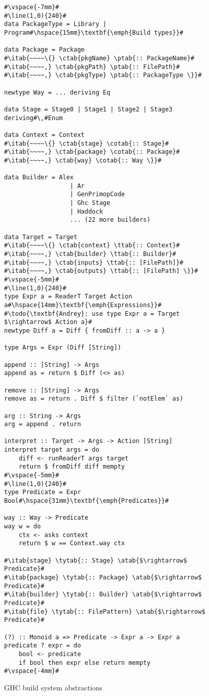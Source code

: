 \begin{figure}
\begin{lstlisting}
#\vspace{-7mm}#
#\line(1,0){240}#
data PackageType = Library | Program#\hspace{15mm}\textbf{\emph{Build types}}#

data Package = Package
#\itab{~~~~\{} \ctab{pkgName} \ptab{:: PackageName}#
#\itab{~~~~,} \ctab{pkgPath} \ptab{:: FilePath}#
#\itab{~~~~,} \ctab{pkgType} \ptab{:: PackageType \}}#

newtype Way = ... deriving Eq

data Stage = Stage0 | Stage1 | Stage2 | Stage3 deriving#\,#Enum

data Context = Context
#\itab{~~~~\{} \ctab{stage} \cotab{:: Stage}#
#\itab{~~~~,} \ctab{package} \cotab{:: Package}#
#\itab{~~~~,} \ctab{way} \cotab{:: Way \}}#

data Builder = Alex
                  | Ar
                  | GenPrimopCode
                  | Ghc Stage
                  | Haddock
                  ... (22 more builders)

data Target = Target
#\itab{~~~~\{} \ctab{context} \ttab{:: Context}#
#\itab{~~~~,} \ctab{builder} \ttab{:: Builder}#
#\itab{~~~~,} \ctab{inputs} \ttab{:: [FilePath]}#
#\itab{~~~~,} \ctab{outputs} \ttab{:: [FilePath] \}}#
#\vspace{-5mm}#
#\line(1,0){240}#
type Expr a = ReaderT Target Action a#\hspace{14mm}\textbf{\emph{Expressions}}#
#\todo{\textbf{Andrey}: use type Expr a = Target $\rightarrow$ Action a}#
newtype Diff a = Diff { fromDiff :: a -> a }

type Args = Expr (Diff [String])

append :: [String] -> Args
append as = return $ Diff (<> as)

remove :: [String] -> Args
remove as = return . Diff $ filter (`notElem` as)

arg :: String -> Args
arg = append . return

interpret :: Target -> Args -> Action [String]
interpret target args = do
    diff <- runReaderT args target
    return $ fromDiff diff mempty
#\vspace{-5mm}#
#\line(1,0){240}#
type Predicate = Expr Bool#\hspace{31mm}\textbf{\emph{Predicates}}#

way :: Way -> Predicate
way w = do
    ctx <- asks context
    return $ w == Context.way ctx

#\itab{stage} \tytab{:: Stage} \atab{$\rightarrow$ Predicate}#
#\itab{package} \tytab{:: Package} \atab{$\rightarrow$ Predicate}#
#\itab{builder} \tytab{:: Builder} \atab{$\rightarrow$ Predicate}#
#\itab{file} \tytab{:: FilePattern} \atab{$\rightarrow$ Predicate}#

(?) :: Monoid a => Predicate -> Expr a -> Expr a
predicate ? expr = do
    bool <- predicate
    if bool then expr else return mempty
#\vspace{-4mm}#
\end{lstlisting}
\caption{GHC build system abstractions\label{fig:abstractions}}
\end{figure}

